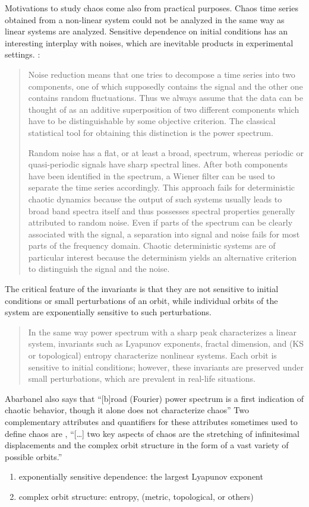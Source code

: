 \documentclass[10pt,twoside,draft]{book}
\begin{document}
Motivations to study chaos come also from practical purposes.
Chaos time series obtained from a non-linear system could not be analyzed in the same way as linear systems are analyzed.
Sensitive dependence on initial conditions has an interesting interplay with noises, which are inevitable products in experimental settings.
\citet[p.51]{kantz-schreiber}:
\begin{quotation}
  Noise reduction means that one tries to decompose a time series into two components, one of which supposedly contains the signal and the other one contains random fluctuations.
  Thus we always assume that the data can be thought of as an additive superposition of two different components which have to be distinguishable by some objective criterion.
  The classical statistical tool for obtaining this distinction is the power spectrum.

  Random noise has a flat, or at least a broad, spectrum, whereas periodic or quasi-periodic signals have sharp spectral lines.
  After both components have been identified in the spectrum, a Wiener filter can be used to separate the time series accordingly.
  This approach fails for deterministic chaotic dynamics because the output of such systems usually leads to broad band spectra itself and thus possesses spectral properties generally attributed to random noise.
  Even if parts of the spectrum can be clearly associated with the signal, a separation into signal and noise fails for most parts of the frequency domain.
  Chaotic deterministic systems are of particular interest because the determinism yields an alternative criterion to distinguish the signal and the noise. 
\end{quotation}
The critical feature of the invariants is that they are not sensitive to initial conditions or small perturbations of an orbit, while individual orbits of the system are exponentially sensitive to such perturbations. \citep[p.1334]{abarbanel}
\begin{quote}
  In the same way power spectrum with a sharp peak characterizes a linear system, invariants such as Lyapunov exponents, fractal dimension, and (KS or topological) entropy characterize nonlinear systems.
  Each orbit is sensitive to initial conditions; however, these invariants are preserved under small perturbations, which are prevalent in real-life situations.
\end{quote}
Abarbanel also says that ``[b]road (Fourier) power spectrum is a first indication of chaotic behavior, though it alone does not characterize chaos''
Two complementary attributes and quantifiers for these attributes sometimes used to define chaos are \citep[p.379]{abarbanel},
``[\ldots] two key aspects of chaos are the stretching of infinitesimal displacements and the complex orbit structure in the form of a vast variety of possible orbits.'' \citep[p.31]{ott1994}
\begin{enumerate}
  \item exponentially sensitive dependence: the largest Lyapunov exponent 
  \item complex orbit structure: entropy, (metric, topological, or others)
\end{enumerate}
\end{document}
